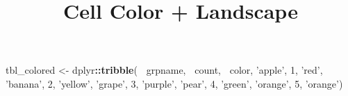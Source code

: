 \documentclass[]{article}
\title{Cell Color + Landscape}
\author{}
\date{\vspace{-2.5em}}
\newenvironment{Shaded}{\begin{snugshade}}{\end{snugshade}}
\newcommand{\DecValTok}[1]{\textcolor[rgb]{0.00,0.00,0.81}{#1}}
\newcommand{\KeywordTok}[1]{\textcolor[rgb]{0.13,0.29,0.53}{\textbf{#1}}}
\newcommand{\NormalTok}[1]{#1}
\newcommand{\OperatorTok}[1]{\textcolor[rgb]{0.81,0.36,0.00}{\textbf{#1}}}
\newcommand{\StringTok}[1]{\textcolor[rgb]{0.31,0.60,0.02}{#1}}
\begin{document}
\maketitle

\begin{Shaded}
\begin{Highlighting}[]
\NormalTok{tbl_colored <-}\StringTok{ }\NormalTok{dplyr}\OperatorTok{::}\KeywordTok{tribble}\NormalTok{( }\OperatorTok{~}\NormalTok{grpname, }\OperatorTok{~}\NormalTok{count, }\OperatorTok{~}\NormalTok{color,}
                               \StringTok{'apple'}\NormalTok{, }\DecValTok{1}\NormalTok{, }\StringTok{'red'}\NormalTok{,}
                               \StringTok{'banana'}\NormalTok{, }\DecValTok{2}\NormalTok{, }\StringTok{'yellow'}\NormalTok{,}
                               \StringTok{'grape'}\NormalTok{, }\DecValTok{3}\NormalTok{, }\StringTok{'purple'}\NormalTok{,}
                               \StringTok{'pear'}\NormalTok{, }\DecValTok{4}\NormalTok{, }\StringTok{'green'}\NormalTok{,}
                               \StringTok{'orange'}\NormalTok{, }\DecValTok{5}\NormalTok{, }\StringTok{'orange'}\NormalTok{)}


\end{Highlighting}
\end{Shaded}
\end{document}
